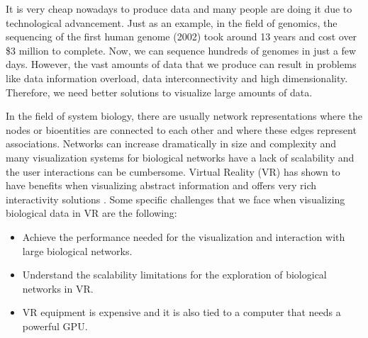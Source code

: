 It is very cheap nowadays to produce data and many people are doing it due to technological advancement. Just as an example, in the field of genomics, the sequencing of the first human genome (2002) took around 13 years and cost over \$3 million to complete. Now, we can sequence hundreds of genomes in just a few days\cite{big_biological_impacts_bd}. However, the vast amounts of data that we produce can result in problems like data information overload, data interconnectivity and high dimensionality. Therefore, we need better solutions to visualize large amounts of data.



In the field of system biology, there are usually network representations where the nodes or bioentities are connected to each other and where these edges represent associations. Networks can increase dramatically in size and complexity and many visualization systems for biological networks have a lack of scalability and the user interactions can be cumbersome. Virtual Reality (VR) has shown to have benefits when visualizing abstract information and offers very rich interactivity solutions \cite{zhang_paciorkowski_craig_cui_2019}. Some specific challenges that we face when visualizing biological data in VR are the following:
\begin{itemize}
  \item Achieve the performance needed for the visualization and interaction with large biological networks.
  \item Understand the scalability limitations for the exploration of biological networks in VR.
  \item VR equipment is expensive and it is also tied to a computer that needs a powerful GPU.
\end{itemize}

